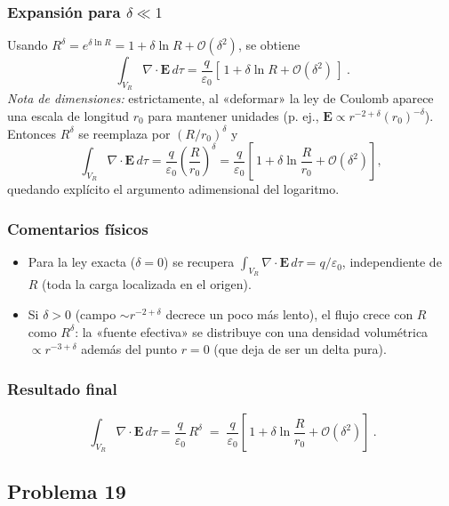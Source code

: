 \documentclass{article}
\begin{document}
\subsubsection*{Expansión para $\delta\ll 1$}
Usando $R^{\delta}=e^{\delta\ln R}=1+\delta\ln R+\mathcal{O}(\delta^{2})$, se obtiene
\[
\boxed{\ \int_{V_R}\nabla\!\cdot\!\mathbf E\,d\tau
=\frac{q}{\varepsilon_0}\left[\,1+\delta\ln R+\mathcal{O}(\delta^{2})\,\right]\ }.
\]
\textit{Nota de dimensiones:} estrictamente, al «deformar» la ley de Coulomb aparece una escala de longitud $r_{0}$ para mantener unidades (p. ej., $\mathbf E\propto r^{-2+\delta}(r_0)^{-\delta}$). Entonces $R^{\delta}$ se reemplaza por $(R/r_0)^{\delta}$ y
\[
\int_{V_R}\nabla\!\cdot\!\mathbf E\,d\tau
=\frac{q}{\varepsilon_0}\left(\frac{R}{r_0}\right)^{\delta}
=\frac{q}{\varepsilon_0}\left[\,1+\delta\ln\!\frac{R}{r_0}+\mathcal{O}(\delta^{2})\right],
\]
quedando explícito el argumento adimensional del logaritmo.

\subsubsection*{Comentarios físicos}
\begin{itemize}
\item Para la ley exacta ($\delta=0$) se recupera $\displaystyle \int_{V_R}\nabla\!\cdot\!\mathbf E\,d\tau=q/\varepsilon_0$, independiente de $R$ (toda la carga localizada en el origen).
\item Si $\delta>0$ (campo $\sim r^{-2+\delta}$ decrece un poco más lento), el flujo crece con $R$ como $R^{\delta}$: la «fuente efectiva» se distribuye con una densidad volumétrica $\propto r^{-3+\delta}$ además del punto $r=0$ (que deja de ser un delta pura).
\end{itemize}

\subsubsection*{Resultado final}
\[
\boxed{\ \displaystyle \int_{V_R}\nabla\!\cdot\!\mathbf E\,d\tau
=\frac{q}{\varepsilon_0}\,R^{\delta}
\;=\;\frac{q}{\varepsilon_0}\left[\,1+\delta\ln\!\frac{R}{r_0}+\mathcal{O}(\delta^{2})\right]\ }.
\]

\subsection{Problema 19} \vspace{0.5cm}
\end{document}
